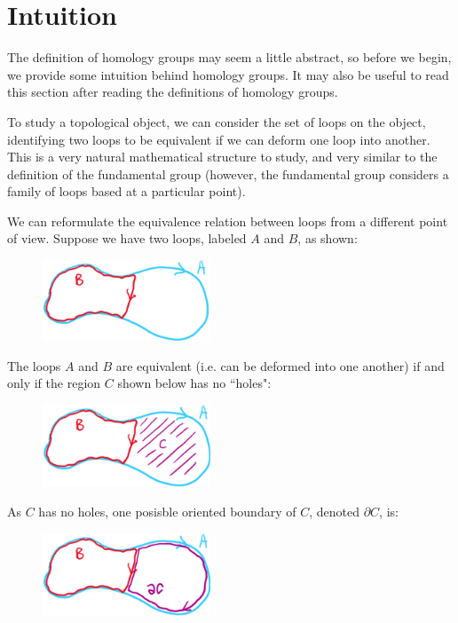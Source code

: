 \section{Intuition}
The definition of homology groups may seem a little abstract, so before we begin, we provide some intuition behind homology groups. It may also be useful to read this section after reading the definitions of homology groups.

To study a topological object, we can consider the set of loops on the object, identifying two loops to be equivalent if we can deform one loop into another. This is a very natural mathematical structure to study, and very similar to the definition of the fundamental group (however, the fundamental group considers a family of loops based at a particular point).

We can reformulate the equivalence relation between loops from a different point of view. Suppose we have two loops, labeled $A$ and $B$, as shown:
\begin{figure}[H]
    \includegraphics[width=5cm]{figures/intuition-1}
    \centering
\end{figure}
The loops $A$ and $B$ are equivalent (i.e. can be deformed into one another) if and only if the region $C$ shown below has no ``holes":
\begin{figure}[H]
    \includegraphics[width=5cm]{figures/intuition-2}
    \centering
\end{figure}
As $C$ has no holes, one posisble oriented boundary of $C$, denoted $\partial C$, is:
\begin{figure}[H]
    \includegraphics[width=5cm]{figures/intuition-3}
    \centering
\end{figure}
